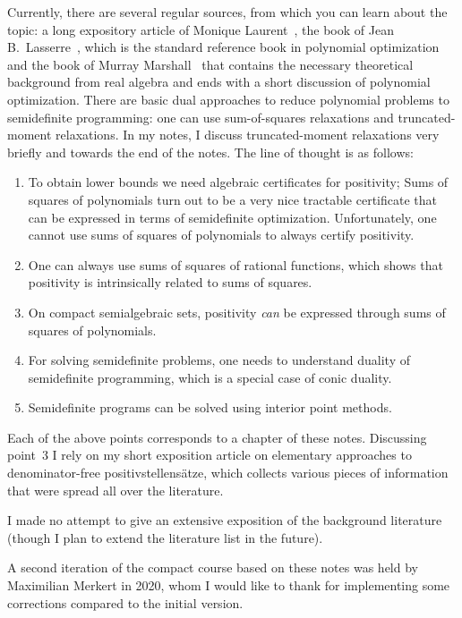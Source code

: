 Currently, there are several regular sources, from which you can learn about the topic: a long expository article of Monique Laurent~\cite{laurent2009sumsofsquares}, the book of Jean B.~Lasserre~\cite{lasserre2015anintroduction}, which is the standard reference book in polynomial optimization and the book of Murray Marshall~\cite{marshall2008positivepolynomials} that contains the necessary theoretical background from real algebra and ends with a short discussion of polynomial optimization.  There are basic dual approaches to reduce polynomial problems to semidefinite programming: one can use sum-of-squares relaxations and truncated-moment relaxations. In my notes, I discuss truncated-moment relaxations very briefly and towards the end of the notes. The line of thought is as follows: 
\begin{enumerate}
	\item To obtain lower bounds we need algebraic certificates for positivity; Sums of squares of polynomials turn out to be a very nice tractable certificate that can be expressed in terms of semidefinite optimization. Unfortunately, one cannot use sums of squares of polynomials to always certify positivity.
	\item One can always use sums of squares of rational functions, which shows that positivity is intrinsically related to sums of squares.
	\item On compact semialgebraic sets, positivity \emph{can} be expressed through sums of squares of polynomials. 
	\item For solving semidefinite problems, one needs to understand duality of semidefinite programming, which is a special case of conic duality. 
	\item Semidefinite programs can be solved using interior point methods. 
\end{enumerate}

Each of the above points corresponds to a chapter of these notes. Discussing point~3 I rely on my short exposition article \cite{averkov2013constructive} on elementary approaches to denominator-free positivstellensätze, which collects various pieces of information that were spread all over the literature. 

I made no attempt to give an extensive exposition of the background literature (though I plan to extend the literature list in the future).

A second iteration of the compact course based on these notes was held by Maximilian Merkert in 2020, whom I would like to thank for implementing some corrections compared to the initial version.

